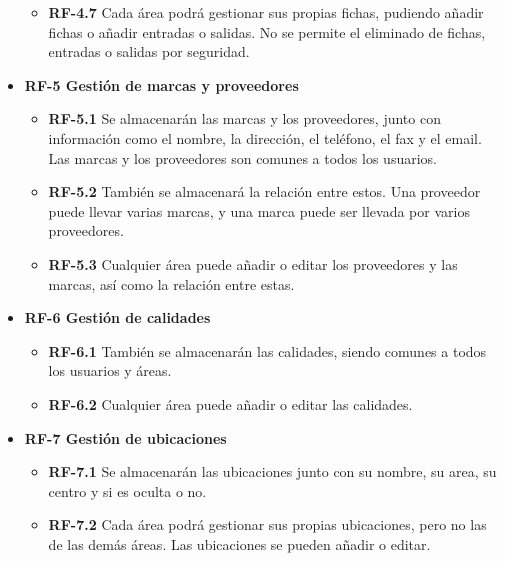 \begin{itemize}
\begin{itemize}
	\item\textbf{ RF-4.7} Cada área podrá gestionar sus propias fichas, pudiendo añadir fichas o añadir entradas o salidas. No se permite el eliminado de fichas, entradas o salidas por seguridad.
	\end{itemize} 
	
	\item \textbf{RF-5 Gestión de marcas y proveedores}
	\begin{itemize}
	\item\textbf{ RF-5.1} Se almacenarán las marcas y los proveedores, junto con información como el nombre, la dirección, el teléfono, el fax y el email. Las marcas y los proveedores son comunes a todos los usuarios.
	
	\item\textbf{ RF-5.2} También se almacenará la relación entre estos. Una proveedor puede llevar varias marcas, y una marca puede ser llevada por varios proveedores.
	
	\item\textbf{ RF-5.3} Cualquier área puede añadir o editar los proveedores y las marcas, así como la relación entre estas.
	\end{itemize}
	
	\item \textbf{RF-6 Gestión de calidades}
	\begin{itemize}
	\item\textbf{ RF-6.1} También se almacenarán las calidades, siendo comunes a todos los usuarios y áreas.
	
	\item\textbf{ RF-6.2} Cualquier área puede añadir o editar las calidades.
	
	\end{itemize}
	
	\item \textbf{RF-7 Gestión de ubicaciones}
	\begin{itemize}
	\item\textbf{ RF-7.1} Se almacenarán las ubicaciones junto con su nombre, su area, su centro y si es oculta o no.
	
	\item\textbf{ RF-7.2} Cada área podrá gestionar sus propias ubicaciones, pero no las de las demás áreas. Las ubicaciones se pueden añadir o editar.
	
	\end{itemize}
	
\end{itemize}


